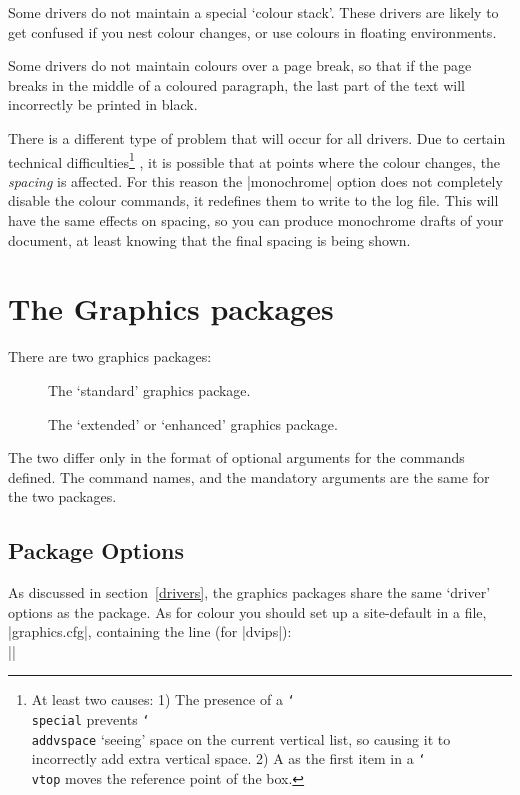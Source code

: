 Some drivers do not maintain a special `colour stack'. These drivers are
likely to get confused if you nest colour changes, or use colours in
floating environments.

Some drivers do not maintain colours over a page break, so that if the
page breaks in the middle of a coloured paragraph, the last part of the
text will incorrectly be printed in black.

There is a different type of problem that will occur for all drivers.
Due to certain technical difficulties\footnote{At least two causes:
1) The presence of a \texttt{\char`\\special}  prevents
\texttt{\char`\\addvspace} `seeing' space on the current vertical list,
so causing it to incorrectly add extra vertical space. 2) A
 as the first item in a \texttt{\char`\\vtop} moves the
reference point of the box.}%
, it is possible that at points
where the colour changes, the \emph{spacing} is affected. For this
reason the |monochrome| option does not completely disable the colour
commands, it redefines them to write to the log file. This will have the
same effects on spacing, so you can produce monochrome drafts of your
document, at least knowing that the final spacing is being shown.
\section{The Graphics packages}
There are two graphics packages:
\begin{description}
\item[] The `standard' graphics package.
\item[] The `extended' or `enhanced' graphics
  package.
\end{description}
The two differ only in the format of optional arguments for the
commands defined. The command names, and the mandatory arguments are
the same for the two packages.

\subsection{Package Options}
As discussed in section~\ref{drivers}, the graphics packages share the
same `driver' options as the  package. As for colour
you should set up a site-default in a file,
|graphics.cfg|, containing the line (for |dvips|):\\
||

